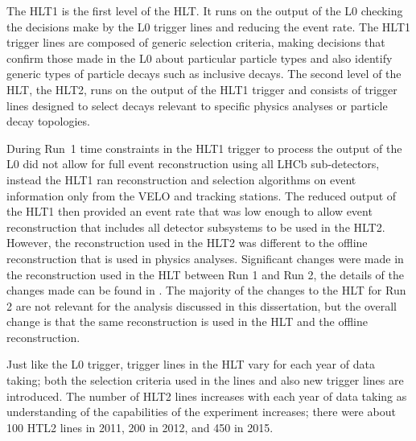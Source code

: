 The HLT1 is the first level of the HLT. It runs on the output of the L0 checking the decisions make by the L0 trigger lines and reducing the event rate. %
The HLT1 trigger lines are composed of generic selection criteria, making decisions that confirm those made in the L0 about particular particle types and also identify generic types of particle decays such as inclusive \bhadron decays. 
The second level of the HLT, the HLT2, runs on the output of the HLT1 trigger and consists of trigger lines designed to select decays relevant to specific physics analyses or particle decay topologies.




During Run~1 time constraints in the HLT1 trigger to process the output of the L0 did not allow for full event reconstruction using all LHCb sub-detectors, instead the HLT1 ran reconstruction and selection algorithms on event information only from the VELO and tracking stations. The reduced output of the HLT1 then provided an event rate that was low enough to allow event reconstruction that includes all detector subsystems to be used in the HLT2. However, the reconstruction used in the HLT2 was different to the offline reconstruction that is used in physics analyses. Significant changes were made in the reconstruction used in the HLT between Run 1 and Run 2, the details of the changes made can be found in \cite{Lupton:2230910}. The majority of the changes to the HLT for Run 2 are not relevant for the analysis discussed in this dissertation, but the overall change is that the same reconstruction is used in the HLT and the offline reconstruction. 


Just like the L0 trigger, trigger lines in the HLT vary for each year of data taking; both the selection criteria used in the lines and also new trigger lines are introduced. The number of HLT2 lines increases with each year of data taking as understanding of the capabilities of the experiment increases; there were about 100 HTL2 lines in 2011, 200 in 2012, and 450 in 2015. 

